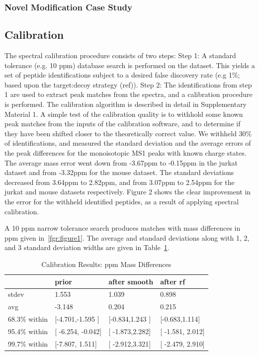 \documentclass[journal=jprobs,manuscript=article]{achemso}
\begin{document}
 
\subsubsection{Novel Modification Case Study}


\subsection{Calibration}

The spectral calibration procedure consists of two steps: Step 1: A standard tolerance (e.g. 10 ppm) database search is performed on the dataset.
This yields a set of peptide identifications subject to a desired false discovery rate (e.g 1\%; based upon the target:decoy strategy (ref)).
Step 2:  The identifications from step 1 are used to extract peak matches from the spectra, and a calibration procedure is performed.
The calibration algorithm is described in detail in Supplementary Material 1.
A simple test of the calibration quality is to withhold some known peak matches from the inputs of the calibration software, and to determine if they have been shifted closer to the theoretically correct value.
We withheld 30\% of identifications, and measured the standard deviation and the average errors of the peak differences for the monoisotopic MS1 peaks with known charge states.
The average mass error went down from -3.67ppm to -0.15ppm in the jurkat dataset and from -3.32ppm for the mouse dataset.
The standard deviations decreased from 3.64ppm to 2.82ppm, and from 3.07ppm to 2.54ppm for the jurkat and mouse datasets respectively.
Figure 2 shows the clear improvement in the error for the withheld identified peptides, as a result of applying spectral calibration.

A 10 ppm narrow tolerance search produces matches with mass differences in ppm given in~\ref{fgr:figure1}.
The average and standard deviations along with 1, 2, and 3 standard deviation widths are given in Table~\ref{tbl:calib}.

\begin{table}
  \caption{Calibration Results: ppm Mass Differences}
  \label{tbl:calib}
  \begin{tabular}{llll}
    \hline
    & prior& after smooth & after rf  \\
    \hline
    stdev&	1.553	&1.039&	0.898 \\
	avg&	-3.148&	0.204&0.215\\
	68.3\% within	& [-4.701,-1.595 ]&	[-0.834,1.243	]&	[-0.683,1.114]\\
	95.4\% within&[	-6.254,	-0.042]&[	-1.873,2.282]&[	-1.581,	2.012]\\
	99.7\% within&	[-7.807,	1.511]&[	-2.912,3.321]&[	-2.479,	2.910]\\
    \hline
  \end{tabular}
\end{table}
\end{document}

